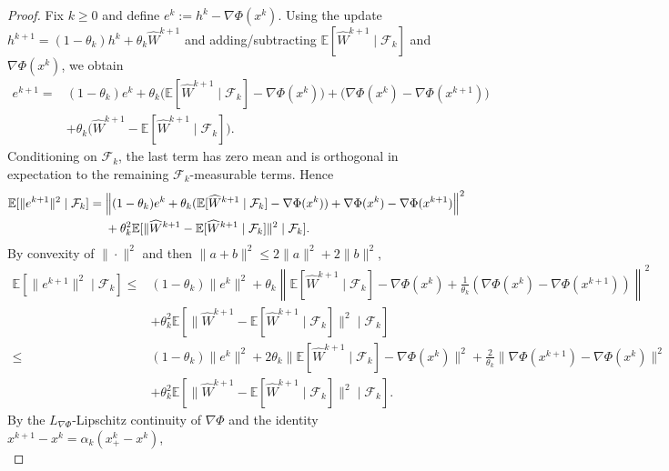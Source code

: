 \documentclass{pkumelon}
\theoremstyle{plain}
\newcommand{\E}{\mathbb{E}}
\newcommand{\Phiobj}{\Phi}
\begin{document}
\begin{proof}
Fix $k\ge 0$ and define $e^k:=h^k-\nabla\Phiobj(x^k)$. Using the update $h^{k+1}=(1-\theta_k)h^k+\theta_k\widehat W^{k+1}$ and adding/subtracting $\E[\widehat W^{k+1}\mid \mathcal F_k]$ and $\nabla\Phiobj(x^k)$, we obtain
\begin{equation*}
\begin{aligned}
e^{k+1}
={}&(1-\theta_k)e^k
+\theta_k\bigl(\E[\widehat W^{k+1}\mid \mathcal F_k]-\nabla\Phiobj(x^k)\bigr)+\bigl(\nabla\Phiobj(x^k)-\nabla\Phiobj(x^{k+1})\bigr) \\
&+\theta_k\bigl(\widehat W^{k+1}-\E[\widehat W^{k+1}\mid \mathcal F_k]\bigr).
\end{aligned}
\end{equation*}
Conditioning on $\mathcal F_k$, the last term has zero mean and is orthogonal in expectation to the remaining $\mathcal F_k$-measurable terms. Hence
\begin{equation*}
\begin{aligned}
\E[\|e^{k+1}\|^2\mid \mathcal F_k]
={}&
\Bigl\|(1-\theta_k)e^k
+\theta_k(\E[\widehat W^{k+1}\mid \mathcal F_k]-\nabla\Phiobj(x^k))+\nabla\Phiobj(x^k)-\nabla\Phiobj(x^{k+1})\Bigr\|^2 \\
&+\theta_k^2\E[\|\widehat W^{k+1}-\E[\widehat W^{k+1}\mid \mathcal F_k]\|^2\mid \mathcal F_k].
\end{aligned}
\end{equation*}
By convexity of $\|\cdot\|^2$ and then $\|a+b\|^2\le 2\|a\|^2+2\|b\|^2$,
\begin{equation*}
\begin{aligned}
\E[\|e^{k+1}\|^2\mid \mathcal F_k]
\le{}&
(1-\theta_k)\|e^k\|^2+\theta_k\left\|
\E[\widehat W^{k+1}\mid \mathcal F_k]-\nabla\Phiobj(x^k)
+\frac{1}{\theta_k}(\nabla\Phiobj(x^k)-\nabla\Phiobj(x^{k+1}))
\right\|^2 \\
&+\theta_k^2\E[\|\widehat W^{k+1}-\E[\widehat W^{k+1}\mid \mathcal F_k]\|^2\mid \mathcal F_k] \\
\le{}&
(1-\theta_k)\|e^k\|^2
+2\theta_k\|\E[\widehat W^{k+1}\mid \mathcal F_k]-\nabla\Phiobj(x^k)\|^2+\frac{2}{\theta_k}\|\nabla\Phiobj(x^{k+1})-\nabla\Phiobj(x^k)\|^2 \\
&+\theta_k^2\E[\|\widehat W^{k+1}-\E[\widehat W^{k+1}\mid \mathcal F_k]\|^2\mid \mathcal F_k].
\end{aligned}
\end{equation*}
By the $L_{\nabla\Phi}$-Lipschitz continuity of $\nabla\Phiobj$ and the identity $x^{k+1}-x^k=\alpha_k(x_+^k-x^k)$,
\begin{equation*}

\end{equation*}
\end{proof}
\end{document}
